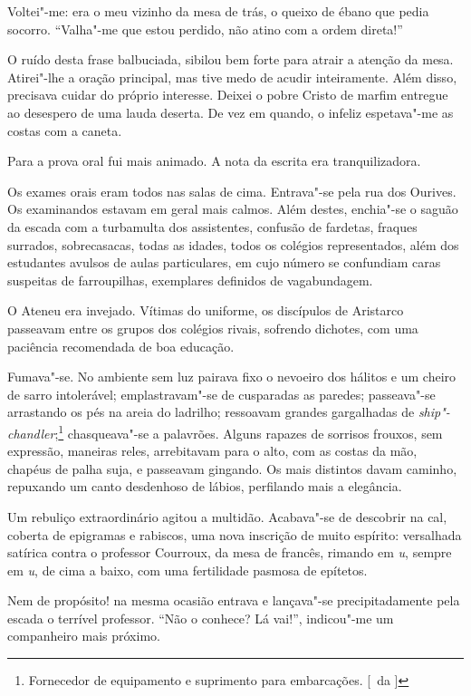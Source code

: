 
Voltei"-me: era o meu vizinho da mesa de
trás, o queixo de ébano que pedia socorro. ``Valha"-me que estou
perdido, não atino com a ordem direta!'' 

O ruído desta frase balbuciada,
sibilou bem forte para atrair a atenção da mesa. Atirei"-lhe a oração
principal, mas tive medo de acudir inteiramente. Além disso, precisava
cuidar do próprio interesse. Deixei o pobre Cristo de marfim entregue
ao desespero de uma lauda deserta. De vez em quando, o infeliz
espetava"-me as costas com a caneta. 

Para a prova oral fui mais
animado. A nota da escrita era tranquilizadora. 

Os exames orais eram
todos nas salas de cima. Entrava"-se pela rua dos Ourives. Os
examinandos estavam em geral mais calmos. Além destes, enchia"-se o
saguão da escada com a turbamulta dos assistentes, confusão de
fardetas, fraques surrados, sobrecasacas, todas as idades, todos os
colégios representados, além dos estudantes avulsos de aulas
particulares, em cujo número se confundiam caras suspeitas de
farroupilhas, exemplares definidos de vagabundagem. 

O Ateneu era
invejado. Vítimas do uniforme, os discípulos de Aristarco passeavam
entre os grupos dos colégios rivais, sofrendo dichotes, com uma
paciência recomendada de boa educação. 

Fumava"-se. No ambiente sem luz
pairava fixo o nevoeiro dos hálitos e um cheiro de sarro intolerável;
emplastravam"-se de cusparadas as paredes; passeava"-se arrastando os
pés na areia do ladrilho; ressoavam grandes gargalhadas de
\textit{ship"-chandler};\footnote{ Fornecedor de equipamento e suprimento para embarcações. [~da ]} 
chasqueava"-se a palavrões. Alguns rapazes de sorrisos 
frouxos, sem expressão, maneiras reles, arrebitavam
para o alto, com as costas da mão, chapéus de palha suja, e passeavam
gingando. Os mais distintos davam caminho, repuxando um canto
desdenhoso de lábios, perfilando mais a elegância. 

Um rebuliço
extraordinário agitou a multidão. Acabava"-se de descobrir na cal,
coberta de epigramas e rabiscos, uma nova inscrição de muito espírito:
versalhada satírica contra o professor Courroux, da mesa de francês,
rimando em \textit{u}, sempre em \textit{u}, de cima a baixo, com uma fertilidade pasmosa
de epítetos. 

Nem de propósito! na mesma ocasião entrava e lançava"-se
precipitadamente pela escada o terrível professor. ``Não o conhece? Lá
vai!'', indicou"-me um companheiro mais próximo. 

